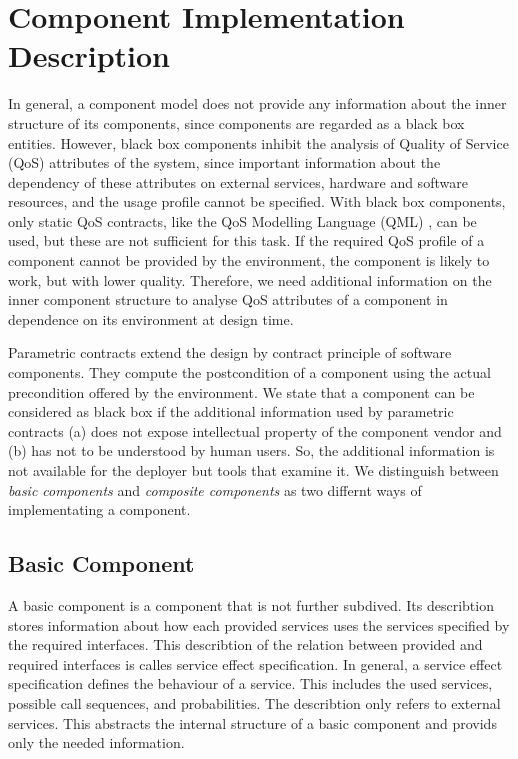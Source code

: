 \section{Component Implementation Description}
\label{sec:ComponentImplementation}

In general, a component model does not provide any information about the inner
structure of its components, since components are regarded as a black box
entities. However, black box components inhibit the analysis of Quality of
Service (QoS) attributes of the system, since important information about the
dependency of these attributes on external services, hardware and software
resources, and the usage profile cannot be specified.  With black box
components, only static QoS contracts, like the QoS Modelling Language (QML)
\cite{frolund1998a}, can be used, but these are not sufficient
for this task. If the required QoS profile of a component cannot be provided by
the environment, the component is likely to work, but with lower quality.
Therefore, we need additional information on the inner component structure to
analyse QoS attributes of a component in dependence on its environment at design
time.

Parametric contracts \cite{TODO:reference} extend the design by contract
principle of software components. They compute the postcondition of a component
using the actual precondition offered by the environment. We state that a
component can be considered as black box if the additional information
used by parametric contracts (a) does not expose intellectual property of
the component vendor and (b) has not to be understood by human users. So, the
additional information is not available for the deployer but tools that
examine it. We distinguish between \emph{basic components} and \emph{composite
components} as two differnt ways of implementating a component.

\subsection{Basic Component}
A basic component is a component that is not further subdived. Its describtion
stores information about how each provided services uses the services
specified by the required interfaces. This describtion of the relation
between provided and required interfaces is calles service effect
specification. In general, a service effect specification defines the
behaviour of a service. This includes the used services, possible call
sequences, and probabilities. The describtion only refers to external services.
This abstracts the internal structure of a basic component and provids only the
needed information.

